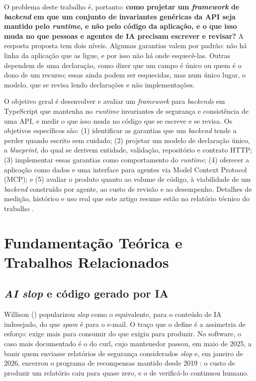 \documentclass[a4paper,12pt]{article}
\newcommand{\estr}[1]{\textit{#1}}
\begin{document}
O problema deste trabalho é, portanto: \textbf{como projetar um \estr{framework} de \estr{backend} em que um conjunto de invariantes genéricas da API seja mantido pelo \estr{runtime}, e não pelo código da aplicação, e o que isso muda no que pessoas e agentes de IA precisam escrever e revisar?} A resposta proposta tem dois níveis. Algumas garantias valem por padrão: não há linha da aplicação que as ligue, e por isso não há onde esquecê-las. Outras dependem de uma declaração, como dizer que um campo é único ou quem é o dono de um recurso; essas ainda podem ser esquecidas, mas num único lugar, o modelo, que se revisa lendo declarações e não implementações.

O objetivo geral é desenvolver e avaliar um \estr{framework} para \estr{backends} em TypeScript que mantenha no \estr{runtime} invariantes de segurança e consistência de uma API, e medir o que isso muda no código que se escreve e se revisa. Os objetivos específicos são: (1) identificar as garantias que um \estr{backend} tende a perder quando escrito sem cuidado; (2) projetar um modelo de declaração único, a \estr{blueprint}, do qual se derivem entidade, validação, repositório e contrato HTTP; (3) implementar essas garantias como comportamento do \estr{runtime}; (4) oferecer a aplicação como dados e uma interface para agentes via Model Context Protocol (MCP); e (5) avaliar o produto quanto ao volume de código, à viabilidade de um \estr{backend} construído por agente, ao custo de revisão e ao desempenho. Detalhes de medição, histórico e uso real que este artigo resume estão no relatório técnico do trabalho \citep{anjos2026tcc}.

\section{Fundamentação Teórica e Trabalhos Relacionados}\label{sec:fund}

\subsection{\textit{AI slop} e código gerado por IA}\label{sec:slop}

Willison (\citeyear{willison2024}) popularizou \estr{slop} como o equivalente, para o conteúdo de IA indesejado, do que \estr{spam} é para o e-mail. O traço que o define é a assimetria de esforço: exige mais para consumir do que exigiu para produzir. No software, o caso mais documentado é o do curl, cujo mantenedor passou, em maio de 2025, a banir quem enviasse relatórios de segurança considerados \estr{slop} \citep{newstack2026} e, em janeiro de 2026, encerrou o programa de recompensas mantido desde 2019 \citep{stenberg2026}: o custo de produzir um relatório caiu para quase zero, e o de verificá-lo continuou humano.
\end{document}

